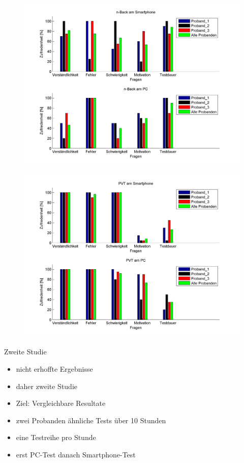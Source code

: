 \begin{frame}
\begin{figure}[htbp]
\centering
\includegraphics[width=0.9\linewidth]{pictures/NBACK_Fragebogen}
\label{fig:question-n-back}
\end{figure}

\end{frame}
\begin{frame}
\begin{figure}
\centering
\includegraphics[width=0.9\linewidth]{pictures/PVT_Fragebogen}
\label{fig:question-pvt}
\end{figure}
\end{frame}
\begin{frame}{Zweite Studie}
	\begin{itemize}[<+->]
	\item nicht erhoffte Ergebnisse
	\item daher zweite Studie
	\item Ziel: Vergleichbare Resultate
	\item zwei Probanden ähnliche Tests über 10 Stunden
	\item eine Testreihe pro Stunde
	\item erst PC-Test danach Smartphone-Test
	\end{itemize}
\end{frame}

